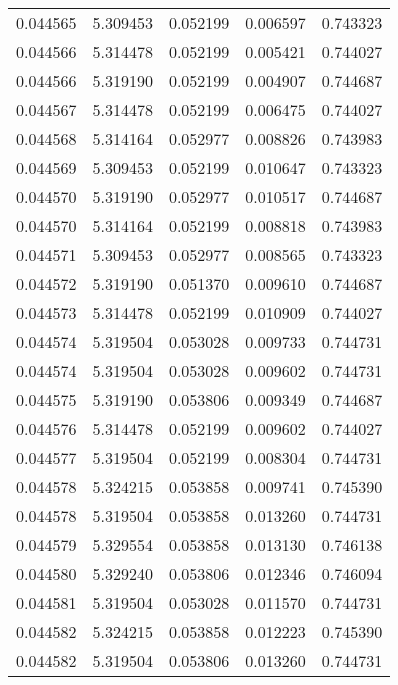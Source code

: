 \begin{tabular}{lrrrr}
0.044565    &  5.309453 &  0.052199 &  0.006597 &             0.743323 \\
0.044566    &  5.314478 &  0.052199 &  0.005421 &             0.744027 \\
0.044566    &  5.319190 &  0.052199 &  0.004907 &             0.744687 \\
0.044567    &  5.314478 &  0.052199 &  0.006475 &             0.744027 \\
0.044568    &  5.314164 &  0.052977 &  0.008826 &             0.743983 \\
0.044569    &  5.309453 &  0.052199 &  0.010647 &             0.743323 \\
0.044570    &  5.319190 &  0.052977 &  0.010517 &             0.744687 \\
0.044570    &  5.314164 &  0.052199 &  0.008818 &             0.743983 \\
0.044571    &  5.309453 &  0.052977 &  0.008565 &             0.743323 \\
0.044572    &  5.319190 &  0.051370 &  0.009610 &             0.744687 \\
0.044573    &  5.314478 &  0.052199 &  0.010909 &             0.744027 \\
0.044574    &  5.319504 &  0.053028 &  0.009733 &             0.744731 \\
0.044574    &  5.319504 &  0.053028 &  0.009602 &             0.744731 \\
0.044575    &  5.319190 &  0.053806 &  0.009349 &             0.744687 \\
0.044576    &  5.314478 &  0.052199 &  0.009602 &             0.744027 \\
0.044577    &  5.319504 &  0.052199 &  0.008304 &             0.744731 \\
0.044578    &  5.324215 &  0.053858 &  0.009741 &             0.745390 \\
0.044578    &  5.319504 &  0.053858 &  0.013260 &             0.744731 \\
0.044579    &  5.329554 &  0.053858 &  0.013130 &             0.746138 \\
0.044580    &  5.329240 &  0.053806 &  0.012346 &             0.746094 \\
0.044581    &  5.319504 &  0.053028 &  0.011570 &             0.744731 \\
0.044582    &  5.324215 &  0.053858 &  0.012223 &             0.745390 \\
0.044582    &  5.319504 &  0.053806 &  0.013260 &             0.744731 \\

\end{tabular}
